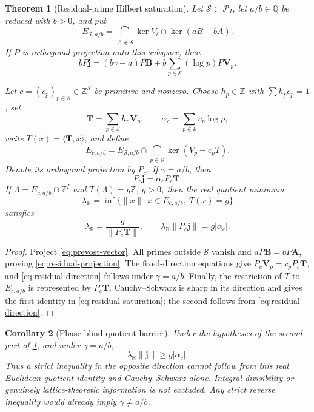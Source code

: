 \documentclass[11pt]{article}
\newtheorem{theorem}{Theorem}[section]
\newtheorem{corollary}[theorem]{Corollary}
\theoremstyle{definition}
\theoremstyle{remark}
\newcommand{\Q}{\mathbb Q}
\newcommand{\R}{\mathbb R}
\newcommand{\Z}{\mathbb Z}
\begin{document}
\begin{theorem}[Residual-prime Hilbert saturation]
\label{thm:residual-prime-saturation}
Let \(\mathcal S\subset\mathcal P_I\), let \(a/b\in\Q\) be reduced with
\(b>0\), and put
\[
 E_{\mathcal S,a/b}
 =\bigcap_{\ell\notin\mathcal S}\ker V_\ell
  \cap\ker(aB-bA).
\]
If \(P\) is orthogonal projection onto this subspace, then
\begin{equation}\label{eq:residual-projection}
 \boxed{\displaystyle
 bP\mathbf j=(b\gamma-a)P\mathbf B
 +b\sum_{p\in\mathcal S}(\log p)P\mathbf V_p.}
\end{equation}

Let \(c=(c_p)_{p\in\mathcal S}\in\Z^{\mathcal S}\) be primitive and
nonzero.  Choose \(h_p\in\Z\) with \(\sum h_pc_p=1\), set
\[
 \mathbf T=\sum_{p\in\mathcal S}h_p\mathbf V_p,
 \qquad
 \alpha_c=\sum_{p\in\mathcal S}c_p\log p,
\]
write \(T(x)=\langle\mathbf T,x\rangle\), and define
\[
 E_{c,a/b}=E_{\mathcal S,a/b}
 \cap\bigcap_{p\in\mathcal S}\ker(V_p-c_pT).
\]
Denote its orthogonal projection by \(P_c\).
If \(\gamma=a/b\), then
\begin{equation}\label{eq:residual-direction}
 \boxed{P_c\mathbf j=\alpha_cP_c\mathbf T.}
\end{equation}
If \(\Lambda=E_{c,a/b}\cap\Z^I\) and \(T(\Lambda)=g\Z\), \(g>0\), then
the real quotient minimum
\[
 \lambda_\R=\inf\{\|x\|:x\in E_{c,a/b},\ T(x)=g\}
\]
satisfies
\begin{equation}\label{eq:residual-saturation}
 \boxed{\displaystyle
 \lambda_\R=\frac g{\|P_c\mathbf T\|},
 \qquad
 \lambda_\R\|P_c\mathbf j\|=g|\alpha_c|.}
\end{equation}
\end{theorem}

\begin{proof}
Project \eqref{eq:prevost-vector}.  All primes outside \(\mathcal S\)
vanish and \(aP\mathbf B=bP\mathbf A\), proving
\eqref{eq:residual-projection}.  The fixed-direction equations give
\(P_c\mathbf V_p=c_pP_c\mathbf T\), and
\eqref{eq:residual-direction} follows under \(\gamma=a/b\).
Finally, the restriction of \(T\) to \(E_{c,a/b}\) is represented by
\(P_c\mathbf T\).  Cauchy--Schwarz is sharp in its direction and gives
the first identity in \eqref{eq:residual-saturation}; the second follows
from \eqref{eq:residual-direction}.
\end{proof}

\begin{corollary}[Phase-blind quotient barrier]
\label{cor:phase-blind-quotient}
Under the hypotheses of the second part of
\cref{thm:residual-prime-saturation}, and under \(\gamma=a/b\),
\[
 \lambda_\R\|\mathbf j\|\ge g|\alpha_c|.
\]
Thus a strict inequality in the opposite direction cannot follow from this
real Euclidean quotient identity and Cauchy--Schwarz alone.  Integral
divisibility or genuinely lattice-theoretic information is not excluded.
Any strict reverse inequality would already imply \(\gamma\ne a/b\).
\end{corollary}
\end{document}

